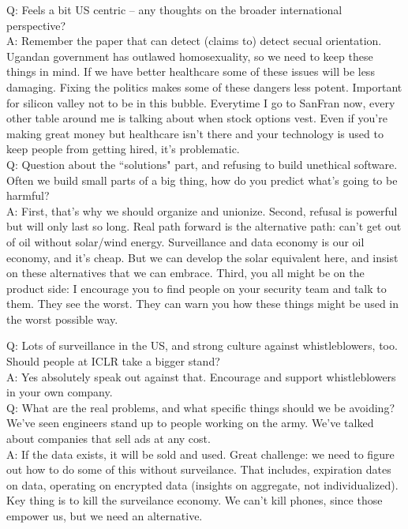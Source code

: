 Q: Feels a bit US centric -- any thoughts on the broader international perspective? \\

A: Remember the paper that can detect (claims to) detect secual orientation. Ugandan government has outlawed homosexuality, so we need to keep these things in mind. If we have better healthcare some of these issues will be less damaging. Fixing the politics makes some of these dangers less potent. Important for silicon valley not to be in this bubble. Everytime I go to SanFran now, every other table around me is talking about when stock options vest. Even if you're making great money but healthcare isn't there and your technology is used to keep people from getting hired, it's problematic. \\

Q: Question about the ``solutions" part, and refusing to build unethical software. Often we build small parts of a big thing, how do you predict what's going to be harmful? \\

A: First, that's why we should organize and unionize. Second, refusal is powerful but will only last so long. Real path forward is the alternative path: can't get out of oil without solar/wind energy. Surveillance and data economy is our oil economy, and it's cheap. But we can develop the solar equivalent here, and insist on these alternatives that we can embrace. Third, you all might be on the product side: I encourage you to find people on your security team and talk to them. They see the worst.  They can warn you how these things might be used in the worst possible way. \\


Q: Lots of surveillance in the US, and strong culture against whistleblowers, too. Should people at ICLR take a bigger stand? \\

A: Yes absolutely speak out against that. Encourage and support whistleblowers in your own company. \\


Q: What are the real problems, and what specific things should we be avoiding? We've seen engineers stand up to people working on the army. We've talked about companies that sell ads at any cost. \\

A: If the data exists, it will be sold and used. Great challenge: we need to figure out how to do some of this without surveilance. That includes, expiration dates on data, operating on encrypted data (insights on aggregate, not individualized). Key thing is to kill the surveilance economy. We can't kill phones, since those empower us, but we need an alternative. 

